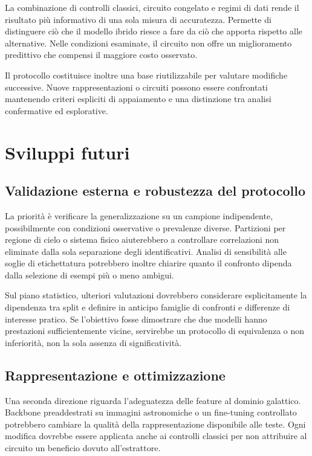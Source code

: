 La combinazione di controlli classici, circuito congelato e
regimi di dati rende il risultato più informativo di una sola
misura di accuratezza. Permette di distinguere ciò che il modello
ibrido riesce a fare da ciò che apporta rispetto alle alternative.
Nelle condizioni esaminate, il circuito non offre un miglioramento
predittivo che compensi il maggiore costo osservato.

Il protocollo costituisce inoltre una base riutilizzabile per
valutare modifiche successive. Nuove rappresentazioni o circuiti
possono essere confrontati mantenendo criteri espliciti di
appaiamento e una distinzione tra analisi confermative ed
esplorative.

\section{Sviluppi futuri}
\label{sec:concl-futuro}

\subsection{Validazione esterna e robustezza del protocollo}

La priorità è verificare la generalizzazione su un campione
indipendente, possibilmente con condizioni osservative o
prevalenze diverse. Partizioni per regione di cielo o sistema
fisico aiuterebbero a controllare correlazioni non eliminate
dalla sola separazione degli identificativi. Analisi di
sensibilità alle soglie di etichettatura potrebbero inoltre
chiarire quanto il confronto dipenda dalla selezione di
esempi più o meno ambigui.

Sul piano statistico, ulteriori valutazioni dovrebbero
considerare esplicitamente la dipendenza tra split e definire
in anticipo famiglie di confronti e differenze di interesse
pratico. Se l'obiettivo fosse dimostrare che due modelli
hanno prestazioni sufficientemente vicine, servirebbe un
protocollo di equivalenza o non inferiorità, non la sola
assenza di significatività.

\subsection{Rappresentazione e ottimizzazione}

Una seconda direzione riguarda l'adeguatezza delle feature
al dominio galattico. Backbone preaddestrati su immagini
astronomiche o un fine-tuning controllato potrebbero cambiare
la qualità della rappresentazione disponibile alle teste.
Ogni modifica dovrebbe essere applicata anche ai controlli
classici per non attribuire al circuito un beneficio dovuto
all'estrattore.

